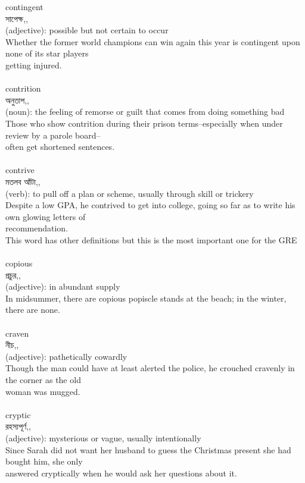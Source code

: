 \documentclass{article}
\begin{document}
{contingent}\\
{সাপেক্ষ,,}\\
{(adjective): possible but not certain to occur\\Whether the former world champions can win again this year is contingent upon none of its star players\\getting injured.\\}\\
{contrition}\\
{অনুতাপ,,}\\
{(noun): the feeling of remorse or guilt that comes from doing something bad\\Those who show contrition during their prison terms--especially when under review by a parole board--\\often get shortened sentences.\\}\\
{contrive}\\
{মতলব আঁটা,,}\\
{(verb): to pull off a plan or scheme, usually through skill or trickery\\Despite a low GPA, he contrived to get into college, going so far as to write his own glowing letters of\\recommendation.\\This word has other definitions but this is the most important one for the GRE\\}\\
{copious}\\
{প্রচুর,,}\\
{(adjective): in abundant supply\\In midsummer, there are copious popiscle stands at the beach; in the winter, there are none.\\}\\
{craven}\\
{নীচ,,}\\
{(adjective): pathetically cowardly\\Though the man could have at least alerted the police, he crouched cravenly in the corner as the old\\woman was mugged.\\}\\
{cryptic}\\
{রহস্যপূর্ণ,,}\\
{(adjective): mysterious or vague, usually intentionally\\Since Sarah did not want her husband to guess the Christmas present she had bought him, she only\\answered cryptically when he would ask her questions about it.\\}\\
\end{document}
